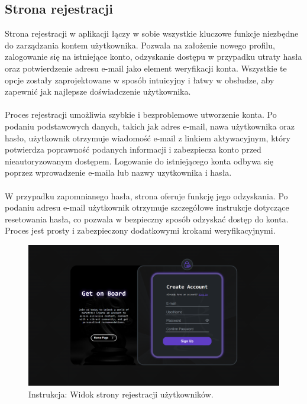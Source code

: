 \documentclass[12pt,a4paper]{article}
\begin{document}
\newpage

\subsection{Strona rejestracji}
Strona rejestracji w aplikacji łączy w sobie wszystkie kluczowe funkcje niezbędne do zarządzania kontem użytkownika. Pozwala na założenie nowego profilu, zalogowanie się na istniejące konto, odzyskanie dostępu w przypadku utraty hasła oraz potwierdzenie adresu e-mail jako element weryfikacji konta. Wszystkie te opcje zostały zaprojektowane w sposób intuicyjny i łatwy w obsłudze, aby zapewnić jak najlepsze doświadczenie użytkownika.
\\\\
Proces rejestracji umożliwia szybkie i bezproblemowe utworzenie konta. Po podaniu podstawowych danych, takich jak adres e-mail, nawa użytkownika oraz hasło, użytkownik otrzymuje wiadomość e-mail z linkiem aktywacyjnym, który potwierdza poprawność podanych informacji i zabezpiecza konto przed nieautoryzowanym dostępem. Logowanie do istniejącego konta odbywa się poprzez wprowadzenie e-maila lub nazwy uzytkownika i hasła.
\\\\
W przypadku zapomnianego hasła, strona oferuje funkcję jego odzyskania. Po podaniu adresu e-mail użytkownik otrzymuje szczegółowe instrukcje dotyczące resetowania hasła, co pozwala w bezpieczny sposób odzyskać dostęp do konta. Proces jest prosty i zabezpieczony dodatkowymi krokami weryfikacyjnymi.

\vspace{0.5cm}
\begin{figure}[h!]
    \centering
    \includegraphics[width=1\textwidth]{images/ins_reg.png}
    \caption{Instrukcja: Widok strony rejestracji użytkowników.}
\end{figure}
\vspace{0.5cm}
\end{document}

